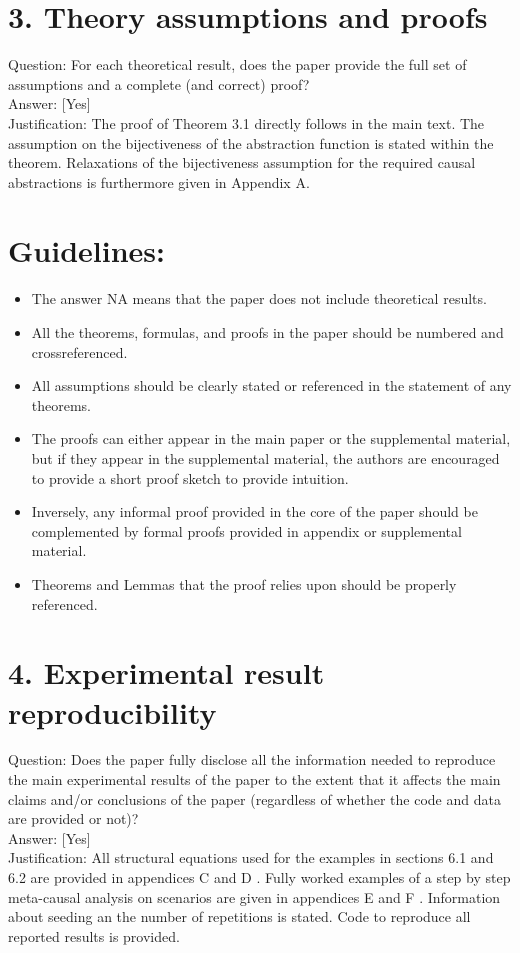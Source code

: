 \documentclass[10pt]{article}
\begin{document}
\section*{3. Theory assumptions and proofs}
Question: For each theoretical result, does the paper provide the full set of assumptions and a complete (and correct) proof?\\[0pt]
Answer: [Yes]\\
Justification: The proof of Theorem 3.1 directly follows in the main text. The assumption on the bijectiveness of the abstraction function is stated within the theorem. Relaxations of the bijectiveness assumption for the required causal abstractions is furthermore given in Appendix A.

\section*{Guidelines:}
\begin{itemize}
  \item The answer NA means that the paper does not include theoretical results.
  \item All the theorems, formulas, and proofs in the paper should be numbered and crossreferenced.
  \item All assumptions should be clearly stated or referenced in the statement of any theorems.
  \item The proofs can either appear in the main paper or the supplemental material, but if they appear in the supplemental material, the authors are encouraged to provide a short proof sketch to provide intuition.
  \item Inversely, any informal proof provided in the core of the paper should be complemented by formal proofs provided in appendix or supplemental material.
  \item Theorems and Lemmas that the proof relies upon should be properly referenced.
\end{itemize}

\section*{4. Experimental result reproducibility}
Question: Does the paper fully disclose all the information needed to reproduce the main experimental results of the paper to the extent that it affects the main claims and/or conclusions of the paper (regardless of whether the code and data are provided or not)?\\[0pt]
Answer: [Yes]\\
Justification: All structural equations used for the examples in sections 6.1 and 6.2 are provided in appendices C and D . Fully worked examples of a step by step meta-causal analysis on scenarios are given in appendices E and F . Information about seeding an the number of repetitions is stated. Code to reproduce all reported results is provided.
\end{document}
